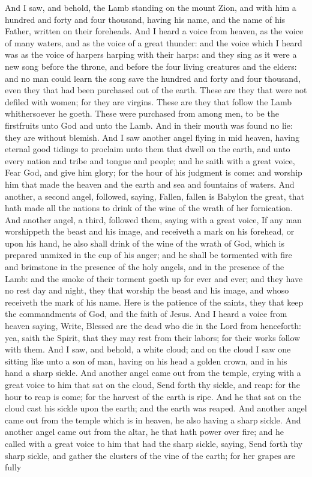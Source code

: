 And I saw, and behold, the Lamb standing on the mount Zion, and with him a hundred and forty and four thousand, having his name, and the name of his Father, written on their foreheads. And I heard a voice from heaven, as the voice of many waters, and as the voice of a great thunder: and the voice which I heard was as the voice of harpers harping with their harps: and they sing as it were a new song before the throne, and before the four living creatures and the elders: and no man could learn the song save the hundred and forty and four thousand, even they that had been purchased out of the earth. These are they that were not defiled with women; for they are virgins. These are they that follow the Lamb whithersoever he goeth. These were purchased from among men, to be the firstfruits unto God and unto the Lamb. And in their mouth was found no lie: they are without blemish.  And I saw another angel flying in mid heaven, having eternal good tidings to proclaim unto them that dwell on the earth, and unto every nation and tribe and tongue and people; and he saith with a great voice, Fear God, and give him glory; for the hour of his judgment is come: and worship him that made the heaven and the earth and sea and fountains of waters.  And another, a second angel, followed, saying, Fallen, fallen is Babylon the great, that hath made all the nations to drink of the wine of the wrath of her fornication.  And another angel, a third, followed them, saying with a great voice, If any man worshippeth the beast and his image, and receiveth a mark on his forehead, or upon his hand, he also shall drink of the wine of the wrath of God, which is prepared unmixed in the cup of his anger; and he shall be tormented with fire and brimstone in the presence of the holy angels, and in the presence of the Lamb: and the smoke of their torment goeth up for ever and ever; and they have no rest day and night, they that worship the beast and his image, and whoso receiveth the mark of his name. Here is the patience of the saints, they that keep the commandments of God, and the faith of Jesus.  And I heard a voice from heaven saying, Write, Blessed are the dead who die in the Lord from henceforth: yea, saith the Spirit, that they may rest from their labors; for their works follow with them.  And I saw, and behold, a white cloud; and on the cloud I saw one sitting like unto a son of man, having on his head a golden crown, and in his hand a sharp sickle. And another angel came out from the temple, crying with a great voice to him that sat on the cloud, Send forth thy sickle, and reap: for the hour to reap is come; for the harvest of the earth is ripe. And he that sat on the cloud cast his sickle upon the earth; and the earth was reaped.  And another angel came out from the temple which is in heaven, he also having a sharp sickle. And another angel came out from the altar, he that hath power over fire; and he called with a great voice to him that had the sharp sickle, saying, Send forth thy sharp sickle, and gather the clusters of the vine of the earth; for her grapes are fully 